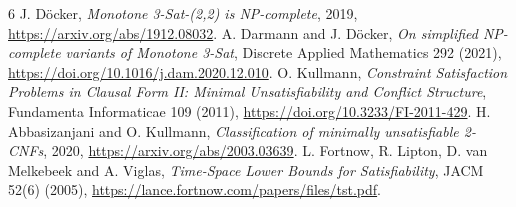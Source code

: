 \documentclass[11pt]{article}
\begin{document}
\begin{thebibliography}{6}
 J. D\"ocker, \emph{Monotone 3-Sat-(2,2) is NP-complete}, 2019, \url{https://arxiv.org/abs/1912.08032}.
 A. Darmann and J. D\"ocker, \emph{On simplified NP-complete variants of Monotone 3-Sat}, Discrete Applied Mathematics 292 (2021), \url{https://doi.org/10.1016/j.dam.2020.12.010}.
 O. Kullmann, \emph{Constraint Satisfaction Problems in Clausal Form II: Minimal Unsatisfiability and Conflict Structure}, Fundamenta Informaticae 109 (2011), \url{https://doi.org/10.3233/FI-2011-429}.
 H. Abbasizanjani and O. Kullmann, \emph{Classification of minimally unsatisfiable 2-CNFs}, 2020, \url{https://arxiv.org/abs/2003.03639}.
 L. Fortnow, R. Lipton, D. van Melkebeek and A. Viglas, \emph{Time-Space Lower Bounds for Satisfiability}, JACM 52(6) (2005), \url{https://lance.fortnow.com/papers/files/tst.pdf}.
\end{thebibliography}
\end{document}
